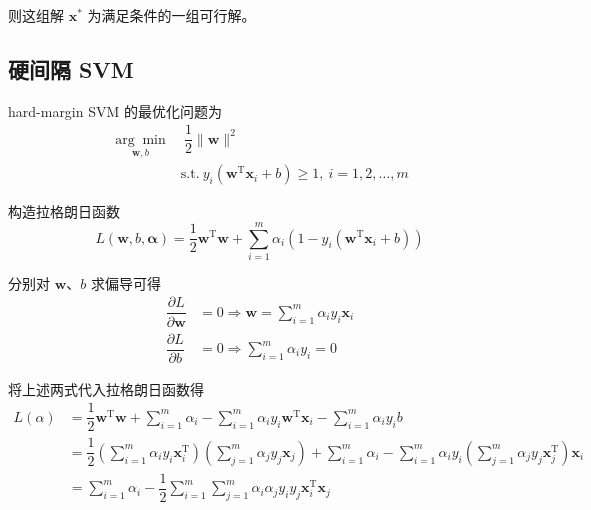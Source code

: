 则这组解 $\boldsymbol x^*$ 为满足条件的一组可行解。

\subsection{硬间隔 SVM}
hard-margin SVM 的最优化问题为
\begin{equation}
    \begin{aligned}
        \underset{\boldsymbol{w}, b}{\arg\min}&\  \dfrac 12 \|\boldsymbol{w}\|^2 \\
        &\text{s.t.}\  y_i(\boldsymbol{w}^\mathrm T\boldsymbol{x}_i + b) \geq 1,\ i = 1, 2, \dots, m
    \end{aligned}
\end{equation}

构造拉格朗日函数
\begin{equation}
    L(\boldsymbol w, b, \boldsymbol \alpha) = \dfrac 12 \boldsymbol w^\mathrm T\boldsymbol w 
    +\sum_{i=1}^m \alpha_i(1 - y_i(\boldsymbol w^\mathrm T\boldsymbol x_i + b))
\end{equation}

分别对 $\boldsymbol w$、$b$ 求偏导可得
\begin{equation}
    \begin{aligned}
        \dfrac{\partial L}{\partial \boldsymbol w} &= 0 \Longrightarrow \boldsymbol w 
        = \sum_{i=1}^m \alpha_iy_i\boldsymbol x_i \\
        \dfrac {\partial L}{\partial b} &= 0 \Longrightarrow \sum_{i = 1}^m \alpha_iy_i = 0
    \end{aligned}
\end{equation}

将上述两式代入拉格朗日函数得
\begin{equation}
    \begin{aligned}
        L(\alpha) &= \dfrac 12 \boldsymbol w^\mathrm T\boldsymbol w + \sum_{i=1}^m \alpha_i - \sum_{i=1}^m \alpha_iy_i\boldsymbol w^\mathrm T \boldsymbol x_i - \sum_{i=1}^m \alpha_iy_ib \\
        &= \dfrac 12 \left(\sum_{i=1}^m \alpha_iy_i \boldsymbol x_i^\mathrm T\right)\left(\sum_{j=1}^m \alpha_jy_j\boldsymbol x_j\right) + \sum_{i=1}^m \alpha_i - \sum_{i=1}^m \alpha_iy_i\left(\sum_{j=1}^m \alpha_jy_j \boldsymbol x_j^\mathrm T\right) \boldsymbol x_i \\
        &= \sum_{i=1}^m \alpha_i - \dfrac 12 \sum_{i=1}^m\sum_{j=1}^m \alpha_i\alpha_jy_iy_j \boldsymbol x_i^\mathrm T \boldsymbol x_j
        \end{aligned}
\end{equation}

